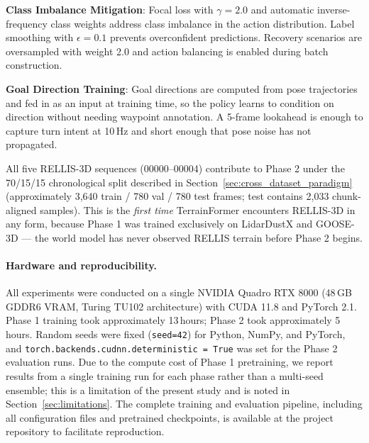 \documentclass[sensors,article,submit,pdftex,moreauthors]{Definitions/mdpi}
\begin{document}
\textbf{Class Imbalance Mitigation}: Focal loss with $\gamma = 2.0$ and automatic inverse-frequency class weights address class imbalance in the action distribution. Label smoothing with $\epsilon = 0.1$ prevents overconfident predictions. Recovery scenarios are oversampled with weight 2.0 and action balancing is enabled during batch construction.

\textbf{Goal Direction Training}: Goal directions are computed from pose trajectories and fed in as an input at training time, so the policy learns to condition on direction without needing waypoint annotation. A 5-frame lookahead is enough to capture turn intent at 10\,Hz and short enough that pose noise has not propagated.

All five RELLIS-3D sequences (00000--00004) contribute to Phase 2 under the 70/15/15 chronological split described in Section~\ref{sec:cross_dataset_paradigm} (approximately 3,640 train / 780 val / 780 test frames; test contains 2,033 chunk-aligned samples). This is the \emph{first time} TerrainFormer encounters RELLIS-3D in any form, because Phase 1 was trained exclusively on LidarDustX and GOOSE-3D --- the world model has never observed RELLIS terrain before Phase 2 begins.

\paragraph{Hardware and reproducibility.}
All experiments were conducted on a single NVIDIA Quadro RTX 8000 (48\,GB GDDR6 VRAM, Turing TU102 architecture) with CUDA 11.8 and PyTorch 2.1. Phase 1 training took approximately 13\,hours; Phase 2 took approximately 5\,hours. Random seeds were fixed (\texttt{seed=42}) for Python, NumPy, and PyTorch, and \texttt{torch.backends.cudnn.deterministic = True} was set for the Phase 2 evaluation runs. Due to the compute cost of Phase 1 pretraining, we report results from a single training run for each phase rather than a multi-seed ensemble; this is a limitation of the present study and is noted in Section~\ref{sec:limitations}. The complete training and evaluation pipeline, including all configuration files and pretrained checkpoints, is available at the project repository to facilitate reproduction.
\end{document}
